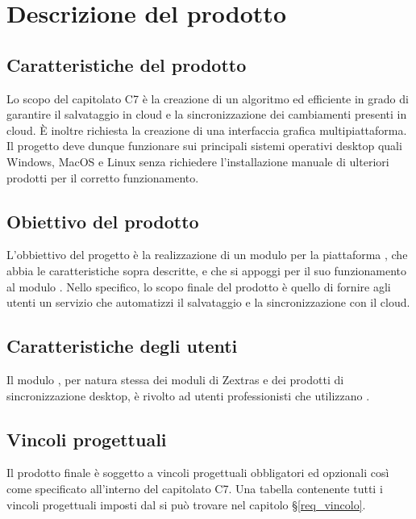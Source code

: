 \section{Descrizione del prodotto}
\subsection{Caratteristiche del prodotto}
Lo scopo del capitolato C7 è la creazione di un algoritmo  ed efficiente in grado di garantire il salvataggio in cloud e la sincronizzazione dei cambiamenti presenti in cloud. È inoltre richiesta la creazione di una interfaccia grafica multipiattaforma. Il progetto deve dunque funzionare sui principali sistemi operativi desktop quali Windows, MacOS e Linux senza richiedere l'installazione manuale di ulteriori prodotti per il corretto funzionamento. 
\subsection{Obiettivo del prodotto}
L'obbiettivo del progetto è la realizzazione di un modulo per la piattaforma , che abbia le caratteristiche sopra descritte, e che si appoggi per il suo funzionamento al modulo .
Nello specifico, lo scopo finale del prodotto è quello di fornire agli utenti un servizio che automatizzi il salvataggio e la sincronizzazione con il cloud.
\subsection{Caratteristiche degli utenti}
Il modulo \progetto{}, per natura stessa dei moduli di Zextras e dei prodotti di sincronizzazione desktop, è rivolto ad utenti professionisti che utilizzano . 
\subsection{Vincoli progettuali}
Il prodotto  finale è soggetto a vincoli progettuali obbligatori ed opzionali così come specificato all'interno del capitolato C7.
Una tabella contenente tutti i vincoli progettuali imposti dal  si può trovare nel capitolo \S{}\ref{req_vincolo}.